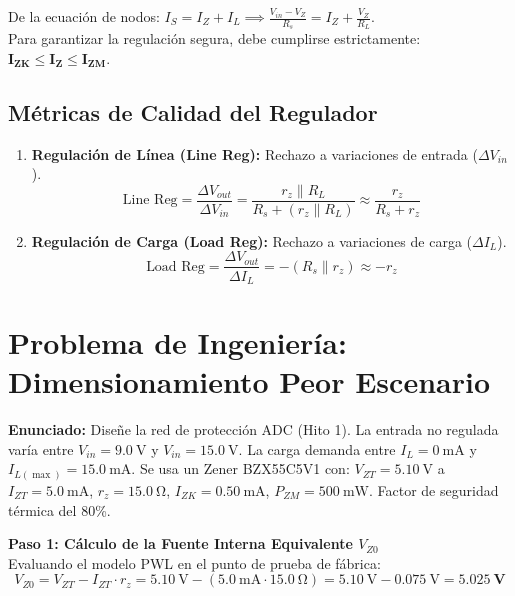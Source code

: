 \documentclass[11pt, a4paper]{article}
\begin{document}
De la ecuación de nodos: $I_S = I_Z + I_L \implies \frac{V_{in} - V_Z}{R_s} = I_Z + \frac{V_Z}{R_L}$.\\
Para garantizar la regulación segura, debe cumplirse estrictamente: $\mathbf{I_{ZK} \le I_Z \le I_{ZM}}$.

\subsection{Métricas de Calidad del Regulador}
\begin{enumerate}
    \item \textbf{Regulación de Línea (Line Reg):} Rechazo a variaciones de entrada ($\Delta V_{in}$).
    \begin{equation}
        \text{Line Reg} = \frac{\Delta V_{out}}{\Delta V_{in}} = \frac{r_z \parallel R_L}{R_s + (r_z \parallel R_L)} \approx \frac{r_z}{R_s + r_z}
    \end{equation}
    \item \textbf{Regulación de Carga (Load Reg):} Rechazo a variaciones de carga ($\Delta I_L$).
    \begin{equation}
        \text{Load Reg} = \frac{\Delta V_{out}}{\Delta I_L} = -(R_s \parallel r_z) \approx -r_z
    \end{equation}
\end{enumerate}

\newpage
\section{Problema de Ingeniería: Dimensionamiento Peor Escenario}
\textbf{Enunciado:} Diseñe la red de protección ADC (Hito 1). La entrada no regulada varía entre $V_{in} = \qty{9.0}{\volt}$ y $V_{in} = \qty{15.0}{\volt}$. La carga demanda entre $I_L = \qty{0}{\milli\ampere}$ y $I_{L(\max)} = \qty{15.0}{\milli\ampere}$. Se usa un Zener BZX55C5V1 con: $V_{ZT} = \qty{5.10}{\volt}$ a $I_{ZT} = \qty{5.0}{\milli\ampere}$, $r_z = \qty{15.0}{\ohm}$, $I_{ZK} = \qty{0.50}{\milli\ampere}$, $P_{ZM} = \qty{500}{\milli\watt}$. Factor de seguridad térmica del 80\%.

\vspace{0.2cm}
\noindent\textbf{Paso 1: Cálculo de la Fuente Interna Equivalente $V_{Z0}$}\\
Evaluando el modelo PWL en el punto de prueba de fábrica:
\begin{equation}
    V_{Z0} = V_{ZT} - I_{ZT} \cdot r_z = \qty{5.10}{\volt} - (\qty{5.0}{\milli\ampere} \cdot \qty{15.0}{\ohm}) = \qty{5.10}{\volt} - \qty{0.075}{\volt} = \mathbf{\qty{5.025}{\volt}}
\end{equation}
\end{document}
